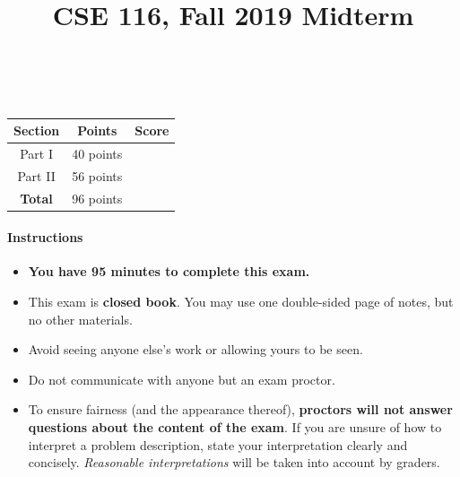 \documentclass[paper=letter, fontsize=13pt]{article} %
\title{\vspace{-2em} 	
\normalfont \normalsize 
{\huge CSE 116, Fall 2019 Midterm} \\ %
\horrule{2pt} \\[0.5cm] %
}
\date{\vspace{-4em}} %
\numberwithin{equation}{section} %
\begin{document}
\maketitle %


\begin{center}
 {\Large
\begin{tabular}{|c|c|c|}
\hline
\textbf{Section} & \textbf{Points} & \textbf{Score} \\
\hline
Part I     & 40 points  & \\
\hline
Part II   &  56 points &   \\
\hline
 \textbf{Total} & 96 points &   \\
\hline
\end{tabular}
}

\end{center}
\large 


\paragraph{\textbf{ Instructions} }
\begin{itemize}

\item \textbf{You have 95 minutes to complete this exam.}

\item This exam is \textbf{closed book}.  You may use one double-sided
page of notes, but no other materials.

\item Avoid seeing anyone else's work or allowing yours to be seen.

\item Do not communicate with anyone but an exam proctor.

\item To ensure fairness (and the appearance thereof),
  \textbf{proctors will not answer questions about the content of the exam}. If you are unsure 
  of how to interpret a problem description, state your interpretation clearly and concisely. 
  \textit{Reasonable interpretations} will be taken into account by graders.

\end{itemize}
\end{document}
